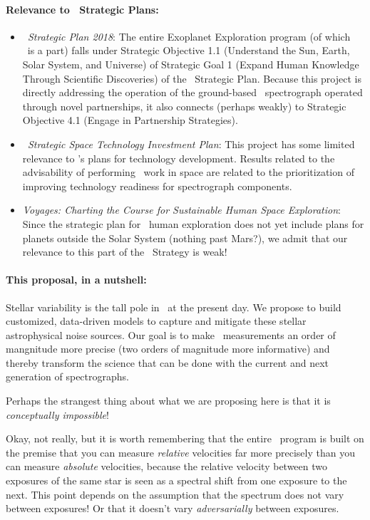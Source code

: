 \documentclass[12pt, letterpaper]{article}
\begin{document}
\paragraph{Relevance to \NASA\ Strategic Plans:}
\begin{itemize}
\item
\textit{\NASA\ Strategic Plan 2018}:
The entire Exoplanet Exploration program (of which \XRP\ is a part) falls under
Strategic Objective 1.1 (Understand the Sun, Earth, Solar System, and Universe)
of Strategic Goal 1 (Expand Human Knowledge Through Scientific Discoveries) of the
\NASA\ Strategic Plan.
Because this project is directly addressing the operation of the
ground-based \NNEXPLORE\ spectrograph operated through novel
partnerships, it also connects (perhaps weakly) to Strategic Objective
4.1 (Engage in Partnership Strategies).
\item
\textit{\NASA\ Strategic Space Technology Investment Plan}:
This project has some limited relevance to \NASA's plans for technology development.
Results related to the advisability of performing \EPRV\ work in space are related to
the prioritization of improving technology readiness for spectrograph components.
\item
\textit{Voyages: Charting the Course for Sustainable Human Space
  Exploration}: Since the strategic plan for \NASA\ human exploration
does not yet include plans for planets outside the Solar System
(nothing past Mars?), we admit that our relevance to this part of the
\NASA\ Strategy is weak!
\end{itemize}

\paragraph{This proposal, in a nutshell:}
Stellar variability is the tall pole in \EPRV\ at the present day.
We propose to build customized, data-driven models to capture and mitigate these
stellar astrophysical noise sources.
Our goal is to make \EPRV\ measurements an order of mangnitude more precise
(two orders of magnitude more informative) and thereby transform the science
that can be done with the current and next generation of spectrographs.


Perhaps the strangest thing about what we are proposing here is that
it is \emph{conceptually impossible}!

Okay, not really, but it is worth remembering that the entire
\EPRV\ program is built on the premise that you can measure
\emph{relative} velocities far more precisely than you can measure
\emph{absolute} velocities, because the relative velocity between two
exposures of the same star is seen as a spectral shift from one
exposure to the next.
This point depends on the assumption that the spectrum does not vary
between exposures!
Or that it doesn't vary \emph{adversarially} between exposures.
\end{document}
